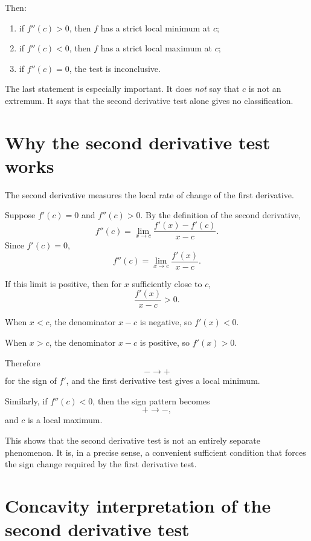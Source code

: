 \documentclass{essay}
\begin{document}
Then:

\begin{enumerate}
    \item if \(f''(c)>0\), then \(f\) has a strict local minimum at \(c\);

    \item if \(f''(c)<0\), then \(f\) has a strict local maximum at \(c\);

    \item if \(f''(c)=0\), the test is inconclusive.
\end{enumerate}

The last statement is especially important. It does \emph{not} say that \(c\) is not an extremum. It says that the second derivative test alone gives no classification.

\section{Why the second derivative test works}

The second derivative measures the local rate of change of the first derivative.

Suppose \(f'(c)=0\) and \(f''(c)>0\).
By the definition of the second derivative,
\[
f''(c)
=
\lim_{x\to c}
\frac{f'(x)-f'(c)}{x-c}.
\]
Since \(f'(c)=0\),
\[
f''(c)
=
\lim_{x\to c}
\frac{f'(x)}{x-c}.
\]

If this limit is positive, then for \(x\) sufficiently close to \(c\),
\[
\frac{f'(x)}{x-c}>0.
\]

When \(x<c\), the denominator \(x-c\) is negative, so \(f'(x)<0\).

When \(x>c\), the denominator \(x-c\) is positive, so \(f'(x)>0\).

Therefore
\[
-\longrightarrow +
\]
for the sign of \(f'\), and the first derivative test gives a local minimum.

Similarly, if \(f''(c)<0\), then the sign pattern becomes
\[
+\longrightarrow -,
\]
and \(c\) is a local maximum.

This shows that the second derivative test is not an entirely separate phenomenon. It is, in a precise sense, a convenient sufficient condition that forces the sign change required by the first derivative test.

\section{Concavity interpretation of the second derivative test}
\end{document}

